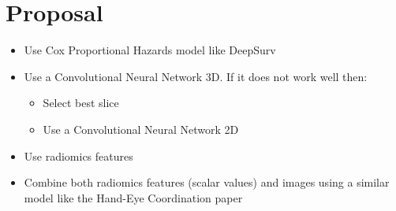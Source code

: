 \section{Proposal}

\begin{frame}{\insertsec}
\begin{itemize}
  \item Use Cox Proportional Hazards model like DeepSurv
  \item Use a Convolutional Neural Network 3D. If it does not work well then:
  \begin{itemize}
    \item Select best slice
    \item Use a Convolutional Neural Network 2D
  \end{itemize}
  \item Use radiomics features
  \item Combine both radiomics features (scalar values) and images using a similar model 
  like the Hand-Eye Coordination paper
\end{itemize}
\end{frame}

